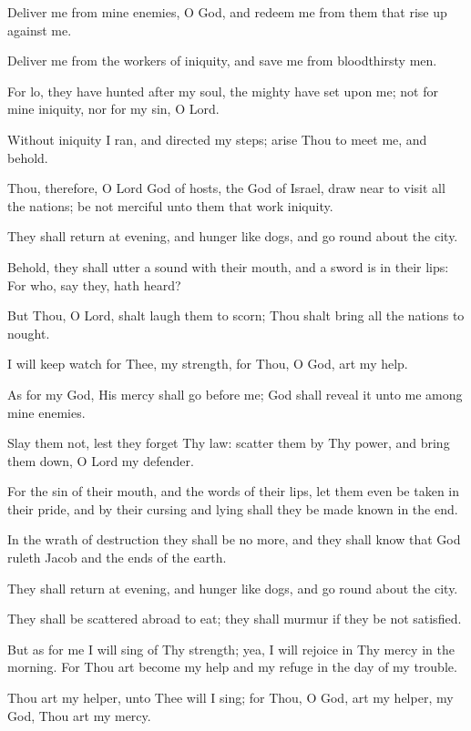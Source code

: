 Deliver me from mine enemies, O God, and redeem me from them that rise up against me.

Deliver me from the workers of iniquity, and save me from bloodthirsty men.

For lo, they have hunted after my soul, the mighty have set upon me; not for mine iniquity, nor for my sin, O Lord.

Without iniquity I ran, and directed my steps; arise Thou to meet me, and behold.

Thou, therefore, O Lord God of hosts, the God of Israel, draw near to visit all the nations; be not merciful unto them that work iniquity.

They shall return at evening, and hunger like dogs, and go round about the city.

Behold, they shall utter a sound with their mouth, and a sword is in their lips: For who, say they, hath heard?

But Thou, O Lord, shalt laugh them to scorn; Thou shalt bring all the nations to nought.

I will keep watch for Thee, my strength, for Thou, O God, art my help.

As for my God, His mercy shall go before me; God shall reveal it unto me among mine enemies.

Slay them not, lest they forget Thy law: scatter them by Thy power, and bring them down, O Lord my defender.

For the sin of their mouth, and the words of their lips, let them even be taken in their pride, and by their cursing and lying shall they be made known in the end.

In the wrath of destruction they shall be no more, and they shall know that God ruleth Jacob and the ends of the earth.

They shall return at evening, and hunger like dogs, and go round about the city.

They shall be scattered abroad to eat; they shall murmur if they be not satisfied.

But as for me I will sing of Thy strength; yea, I will rejoice in Thy mercy in the morning. For Thou art become my help and my refuge in the day of my trouble.

Thou art my helper, unto Thee will I sing; for Thou, O God, art my helper, my God, Thou art my mercy.
